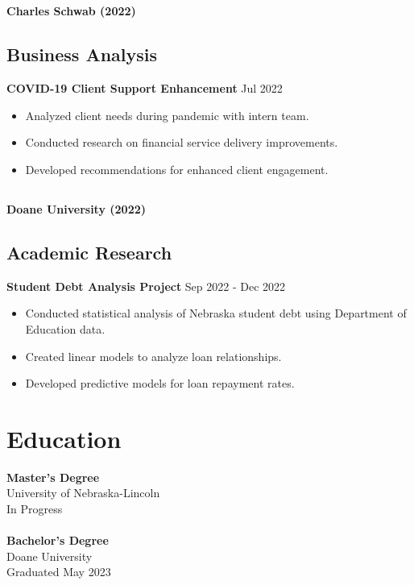\documentclass[a4paper,10pt]{article}
\begin{document}
\subsection*{}

\textbf{Charles Schwab (2022)}

\subsection*{Business Analysis}

\textbf{COVID-19 Client Support Enhancement} \hfill Jul 2022
\begin{itemize}[noitemsep, topsep=0pt]
    \item Analyzed client needs during pandemic with intern team.
    \item Conducted research on financial service delivery improvements.
    \item Developed recommendations for enhanced client engagement.
\end{itemize}

\subsection*{}


\textbf{Doane University (2022)}

\subsection*{Academic Research}

\textbf{Student Debt Analysis Project} \hfill Sep 2022 - Dec 2022
\begin{itemize}[noitemsep, topsep=0pt]
    \item Conducted statistical analysis of Nebraska student debt using Department of Education data.
    \item Created linear models to analyze loan relationships.
    \item Developed predictive models for loan repayment rates.
\end{itemize}

\section*{Education}
\textbf{Master's Degree} \\
University of Nebraska-Lincoln \\
In Progress\\\\
\textbf{Bachelor's Degree} \\
Doane University \\
Graduated May 2023
\end{document}

